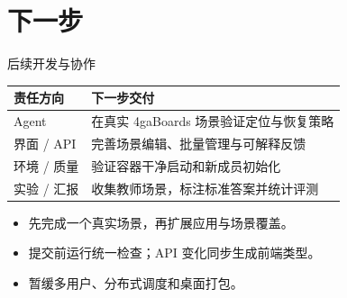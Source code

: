 \section{下一步}
\begin{frame}{后续开发与协作}
\begin{tabular}{ll}\toprule
责任方向 & 下一步交付 \\\midrule
Agent & 在真实 4gaBoards 场景验证定位与恢复策略 \\
界面 / API & 完善场景编辑、批量管理与可解释反馈 \\
环境 / 质量 & 验证容器干净启动和新成员初始化 \\
实验 / 汇报 & 收集教师场景，标注标准答案并统计评测 \\\bottomrule
\end{tabular}
\vfill
\begin{itemize}
\item 先完成一个真实场景，再扩展应用与场景覆盖。
\item 提交前运行统一检查；API 变化同步生成前端类型。
\item 暂缓多用户、分布式调度和桌面打包。
\end{itemize}
\end{frame}

